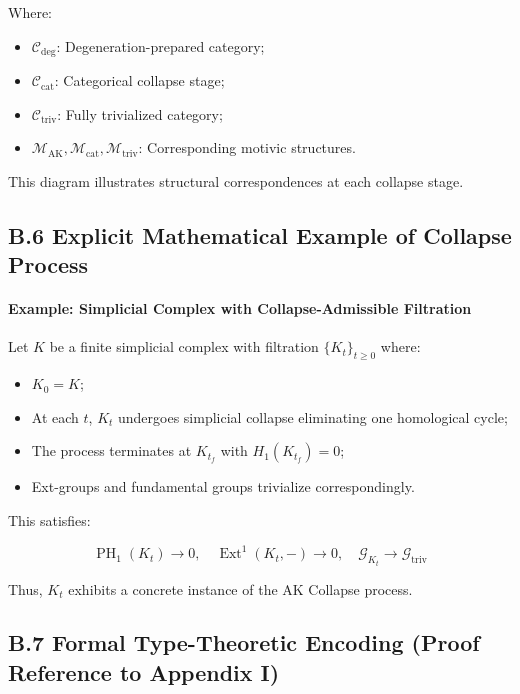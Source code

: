 \documentclass[11pt]{article}
\DeclareMathOperator{\Ext}{Ext}
\DeclareMathOperator{\PH}{PH}
\begin{document}
Where:

\begin{itemize}
    \item $\mathcal{C}_{\mathrm{deg}}$: Degeneration-prepared category;
    \item $\mathcal{C}_{\mathrm{cat}}$: Categorical collapse stage;
    \item $\mathcal{C}_{\mathrm{triv}}$: Fully trivialized category;
    \item $\mathcal{M}_{\mathrm{AK}}, \mathcal{M}_{\mathrm{cat}}, \mathcal{M}_{\mathrm{triv}}$: Corresponding motivic structures.
\end{itemize}

This diagram illustrates structural correspondences at each collapse stage.

\subsection*{B.6 Explicit Mathematical Example of Collapse Process}

\paragraph{Example: Simplicial Complex with Collapse-Admissible Filtration}

Let $K$ be a finite simplicial complex with filtration $\{K_t\}_{t \geq 0}$ where:

\begin{itemize}
    \item $K_0 = K$;
    \item At each $t$, $K_t$ undergoes simplicial collapse eliminating one homological cycle;
    \item The process terminates at $K_{t_f}$ with $H_1(K_{t_f}) = 0$;
    \item Ext-groups and fundamental groups trivialize correspondingly.
\end{itemize}

This satisfies:

\[
\PH_1(K_t) \to 0, \quad \Ext^1(K_t, -) \to 0, \quad \mathcal{G}_{K_t} \to \mathcal{G}_{\mathrm{triv}}
\]

Thus, $K_t$ exhibits a concrete instance of the AK Collapse process.

\subsection*{B.7 Formal Type-Theoretic Encoding (Proof Reference to Appendix I)}
\end{document}
